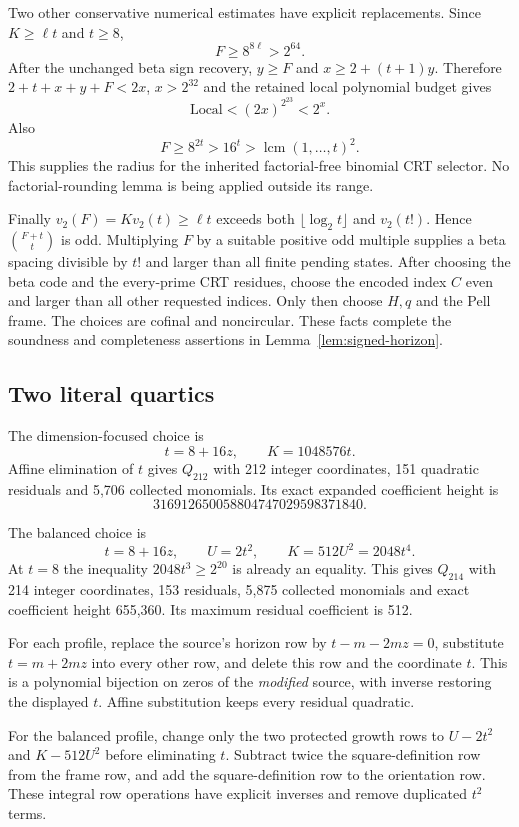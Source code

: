 Two other conservative numerical estimates have explicit replacements.
Since $K\ge\ell t$ and $t\ge8$,
\[
 F\ge8^{8\ell}>2^{64}.
\]
After the unchanged beta sign recovery, $y\ge F$ and
$x\ge2+(t+1)y$. Therefore
$2+t+x+y+F<2x$, $x>2^{32}$ and the retained local polynomial budget
gives
\[
 \mathrm{Local}<(2x)^{2^{23}}<2^x.
\]
Also
\[
 F\ge8^{2t}>16^t>
   \operatorname{lcm}(1,\ldots,t)^2.
\]
This supplies the radius for the inherited factorial-free binomial
CRT selector. No factorial-rounding lemma is being applied outside
its range.

Finally
$v_2(F)=K v_2(t)\ge\ell t$ exceeds both
$\lfloor\log_2t\rfloor$ and $v_2(t!)$. Hence
$\binom{F+t}{t}$ is odd. Multiplying $F$ by a suitable positive
odd multiple supplies a beta spacing divisible by $t!$ and larger
than all finite pending states. After choosing the beta code and
the every-prime CRT residues, choose the encoded index $C$ even
and larger than all other requested indices. Only then choose
$H,q$ and the Pell frame. The choices are cofinal and noncircular.
These facts complete the soundness and completeness assertions
in Lemma~\ref{lem:signed-horizon}.

\subsection{Two literal quartics}

The dimension-focused choice is
\[
 t=8+16z,\qquad K=1048576t.
\]
Affine elimination of $t$ gives $Q_{212}$ with 212 integer
coordinates, 151 quadratic residuals and 5,706 collected monomials.
Its exact expanded coefficient height is
\[
 316912650058804747029598371840.
\]

The balanced choice is
\[
 t=8+16z,\qquad U=2t^2,\qquad K=512U^2=2048t^4.
\]
At $t=8$ the inequality $2048t^3\ge2^{20}$ is already an equality.
This gives $Q_{214}$ with 214 integer coordinates, 153 residuals,
5,875 collected monomials and exact coefficient height 655,360.
Its maximum residual coefficient is 512.

For each profile, replace the source's horizon row by
$t-m-2mz=0$, substitute $t=m+2mz$ into every other row, and
delete this row and the coordinate $t$. This is a polynomial
bijection on zeros of the \emph{modified} source, with inverse
restoring the displayed $t$. Affine substitution keeps every
residual quadratic.

For the balanced profile, change only the two protected growth
rows to $U-2t^2$ and $K-512U^2$ before eliminating $t$.
Subtract twice the square-definition row from the frame row,
and add the square-definition row to the orientation row.
These integral row operations have explicit inverses and remove
duplicated $t^2$ terms.

